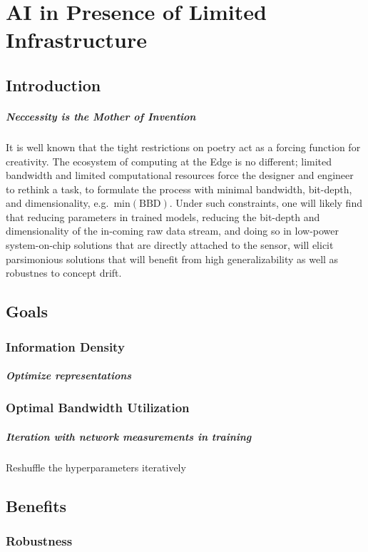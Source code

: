 \chapter{AI in Presence of Limited Infrastructure}
\label{chap:limited_infra}

\lipsum[1-2]
\section{Introduction}\label{sec:limited_infra:intro}
\lipsum[2-4]
\paragraph{Neccessity is the Mother of Invention}
It is well known that the tight restrictions on poetry act as a forcing function for creativity.
The ecosystem of computing at the Edge is no different; limited bandwidth and limited computational resources force the designer and engineer to rethink a task, to formulate the process with minimal bandwidth, bit-depth, and dimensionality, e.g.~$\mbox{min}\left(\mbox{BBD}\right)$.
Under such constraints, one will likely find that reducing parameters in trained models, reducing the bit-depth and dimensionality of the in-coming raw data stream, and doing so in low-power system-on-chip solutions that are directly attached to the sensor, will elicit parsimonious solutions that will benefit from high generalizability as well as robustnes to concept drift.

\section{Goals}
\subsection{Information Density}
\paragraph{Optimize representations}
\subsection{Optimal Bandwidth Utilization}
\paragraph{Iteration with network measurements in training}
Reshuffle the hyperparameters iteratively 

\section{Benefits}
\subsection{Robustness}